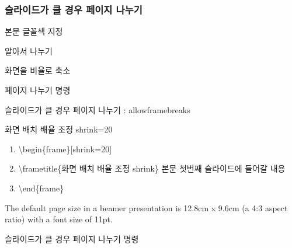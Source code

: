 \documentclass[9pt,blue,xcolor=pdftex,dvipsnames,table,handout,notes]{beamer}
\begin{document}
		\begin{frame}[t]
		\frametitle{슬라이드가 클 경우 페이지 나누기}

			\begin{block} {본문 글꼴색 지정}
			\begin{description}[12345678901234567890]
			\item[allowframebreaks] 알아서 나누기 
			\item[shrink] 화면을 비율로 축소
			\item[] 페이지 나누기 명령
			\end{description}
			\end{block}


			\begin{block} {슬라이드가 클 경우 페이지 나누기 : allowframebreaks}
			\end{block}


			
			\begin{block} {화면 배치 배율 조정 shrink=20}
			\begin{enumerate}
			\item[]	\textbackslash begin\{frame\}[shrink=20]
			\item[]	\textbackslash frametitle\{화면 배치 배율 조정 shrink\}
					본문 첫번째 슬라이드에 들어갈 내용\\
			\item[]	\textbackslash end\{frame\}
			\end{enumerate}
			\end{block}

			The default page size in a beamer presentation is 12.8cm x 9.6cm (a 4:3 aspect ratio) with a font size of 11pt.


			\begin{block} {슬라이드가 클 경우 페이지 나누기 명령}
			\end{block}


		\end{frame}
\end{document}
